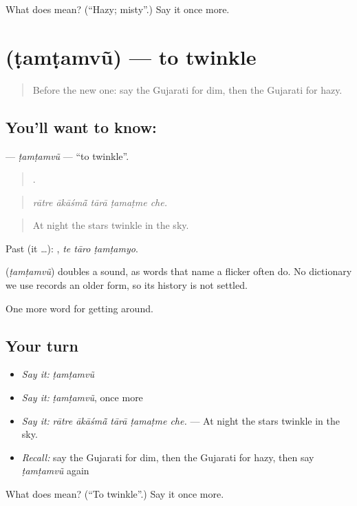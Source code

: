 \begin{tcolorbox}[breakable,colback=teal!4,colframe=teal!35!black,title={Before you move on}]
What does  mean? (\textquotedblleft{}Hazy; misty\textquotedblright{}.) Say it once more.
\end{tcolorbox}
\section[\texorpdfstring{\gu{ટમટમવું} (ṭamṭamvũ)}{ટમટમવું (ṭamṭamvũ)}]{ (ṭamṭamvũ) — to twinkle}

\label{lesson:GU-C438-tamtamvu}



\begin{quote}
Before the new one: say the Gujarati for dim, then the Gujarati for hazy.
\end{quote}

\subsection*{You'll want to know: }
\textbf{} — \emph{ṭamṭamvũ} — \textquotedblleft{}to twinkle\textquotedblright{}.

\begin{quote}
    .
\end{quote}

\begin{quote}
\emph{rātre ākāśmā̃ tārā ṭamaṭme che.}
\end{quote}

\begin{quote}
At night the stars twinkle in the sky.
\end{quote}

Past (it …):   , \emph{te tāro ṭamṭamyo}.

\begin{cousinweb}
\textbf{} (\emph{ṭamṭamvũ}) doubles a sound, as words that name a flicker often do. No dictionary we use records an older form, so its history is not settled.
\end{cousinweb}

\begin{grammarlens}[title={What you've built}]
One more word for getting around.
\end{grammarlens}

\subsection*{Your turn}
\begin{itemize}
\raggedright
  \item \emph{Say it:} \emph{ṭamṭamvũ}
  \item \emph{Say it:} \emph{ṭamṭamvũ}, once more
  \item \emph{Say it:} \emph{rātre ākāśmā̃ tārā ṭamaṭme che.} — At night the stars twinkle in the sky.
  \item \emph{Recall:} say the Gujarati for dim, then the Gujarati for hazy, then say \emph{ṭamṭamvũ} again
\end{itemize}

\begin{tcolorbox}[breakable,colback=teal!4,colframe=teal!35!black,title={Before you move on}]
What does  mean? (\textquotedblleft{}To twinkle\textquotedblright{}.) Say it once more.
\end{tcolorbox}
